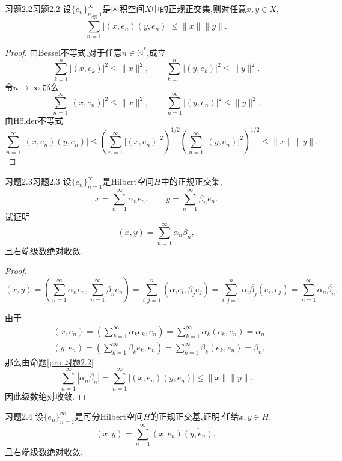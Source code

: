 \documentclass[lang = cn, scheme = chinese]{elegantbook}
\newcommand{\N}{\mathbb{N}}            %
\begin{document}
	\begin{proposition}{习题2.2}{习题2.2}
		设$\{e_n\}_{n=1}^\infty$是内积空间$X$中的正规正交集,则对任意$x,y\in X$,
		$$
		\sum_{n=1}^{\infty}| (x,e_n)(y,e_n) |\le \|x\| \|y\|.
		$$
	\end{proposition}
	
	\begin{proof}
		由Bessel不等式,对于任意$n\in\N^*$,成立
		$$
		\sum_{k=1}^{n}|(x,e_k)|^2\le \|x\|^2,\qquad 
		\sum_{k=1}^{n}|(y,e_k)|^2\le \|y\|^2.
		$$
		令$n\to\infty$,那么
		$$
		\sum_{n=1}^{\infty}|(x,e_n)|^2\le \|x\|^2,\qquad 
		\sum_{n=1}^{\infty}|(y,e_n)|^2\le \|y\|^2.
		$$
		由Hölder不等式
		$$
		\sum_{n=1}^{\infty}|(x,e_n)(y,e_n)|\le
		\left(\sum_{n=1}^{\infty}|(x,e_n)|^2\right)^{1/2}\left(\sum_{n=1}^{\infty}|(y,e_n)|^2\right)^{1/2}\le
		\|x\|\|y\|.
		$$
	\end{proof}
	
	\begin{proposition}{习题2.3}{习题2.3}
		设$\{e_n\}_{n=1}^{\infty}$是Hilbert空间$H$中的正规正交集,
		$$
		x=\sum_{n=1}^{\infty}\alpha_n e_n,\qquad
		y=\sum_{n=1}^{\infty}\beta_n e_n.
		$$
		试证明
		$$
		(x,y)=\sum_{n=1}^{\infty}\alpha_n\overline{\beta_n},
		$$
		且右端级数绝对收敛.
	\end{proposition}
	
	\begin{proof}
		$$
		(x,y)
		= \left(\sum_{n=1}^{\infty}\alpha_n e_n,\sum_{n=1}^{\infty}\beta_n e_n\right)
		= \sum_{i,j=1}^{n}(\alpha_i e_i,\beta_j e_j)
		= \sum_{i,j=1}^{n}\alpha_i\overline{\beta_j}(e_i,e_j)
		= \sum_{n=1}^{\infty}\alpha_n \overline{\beta_n}.
		$$
		
		由于
		\begin{align*}
			& (x,e_n)
			= \left(\sum_{k=1}^{\infty}\alpha_k e_k,e_n\right)
			= \sum_{k=1}^{\infty}\alpha_k (e_k,e_n)
			= \alpha_n\\
			& (y,e_n)
			= \left(\sum_{k=1}^{\infty}\beta_k e_k,e_n\right)
			= \sum_{k=1}^{\infty}\beta_k (e_k,e_n)
			= \beta_n,
		\end{align*}
		那么由命题\ref{pro:习题2.2}
		$$
		\sum_{n=1}^{\infty}|\alpha_n\overline{\beta_n}|=
		\sum_{n=1}^{\infty}|(x,e_n)(y,e_n)|\le \|x\| \|y\|.
		$$
		因此级数绝对收敛.
	\end{proof}
	
	\begin{proposition}{习题2.4}
		设$\{e_n\}_{n=1}^{\infty}$是可分Hilbert空间$H$的正规正交基,证明:任给$x,y\in H$,
		$$
		(x,y)=\sum_{n=1}^{\infty}(x,e_n)\overline{(y,e_n)},
		$$
		且右端级数绝对收敛.
	\end{proposition}
	
\end{document}
